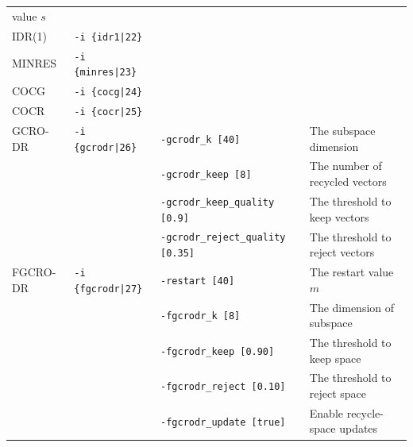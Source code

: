 \documentclass[a4paper]{article}
\begin{document}
\begin{minipage}[t]{\textwidth}
\begin{center}
\begin{tabular}{l|lll}
 value $s$  \\
 IDR(1)      & \verb=-i {idr1|22}=      &    \\ 
 MINRES      & \verb=-i {minres|23}=    &    \\
 COCG        & \verb=-i {cocg|24}=      &    \\
 COCR        & \verb=-i {cocr|25}=      &    \\   
 GCRO-DR     & \verb=-i {gcrodr|26}=    & \verb=-gcrodr_k [40]= & The subspace dimension \\ 
             &                          & \verb=-gcrodr_keep [8]= & The number of recycled vectors \\ 
             &                          & \verb=-gcrodr_keep_quality [0.9]= & The threshold to keep vectors \\ 
 &                          & \verb=-gcrodr_reject_quality [0.35]= & The threshold to reject vectors \\   
 FGCRO-DR    & \verb=-i {fgcrodr|27}=   & \verb=-restart [40]= & The restart value $m$ \\
             &                          & \verb=-fgcrodr_k [8]= & The dimension of subspace \\
             &                          & \verb=-fgcrodr_keep [0.90]= & The threshold to keep space \\
             &                          & \verb=-fgcrodr_reject [0.10]= & The threshold to reject space \\
             &                          & \verb=-fgcrodr_update [true]= & Enable recycle-space updates \\
\hline         
\end{tabular}
\end{center}
\end{minipage}
\\ \\
\end{document}
